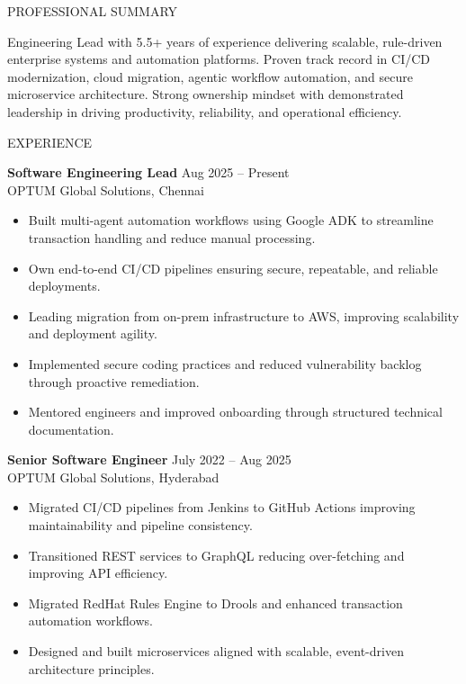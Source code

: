 \documentclass{resume}
\begin{document}
\begin{rSection}{PROFESSIONAL SUMMARY}

Engineering Lead with 5.5+ years of experience delivering scalable, rule-driven enterprise systems and automation platforms. Proven track record in CI/CD modernization, cloud migration, agentic workflow automation, and secure microservice architecture. Strong ownership mindset with demonstrated leadership in driving productivity, reliability, and operational efficiency.

\end{rSection}

\begin{rSection}{EXPERIENCE}

\textbf{Software Engineering Lead} \hfill Aug 2025 – Present \\
OPTUM Global Solutions, Chennai
\begin{itemize}
\itemsep -3pt {}
\item Built multi-agent automation workflows using Google ADK to streamline transaction handling and reduce manual processing.
\item Own end-to-end CI/CD pipelines ensuring secure, repeatable, and reliable deployments.
\item Leading migration from on-prem infrastructure to AWS, improving scalability and deployment agility.
\item Implemented secure coding practices and reduced vulnerability backlog through proactive remediation.
\item Mentored engineers and improved onboarding through structured technical documentation.
\end{itemize}

\textbf{Senior Software Engineer} \hfill July 2022 – Aug 2025 \\
OPTUM Global Solutions, Hyderabad
\begin{itemize}
\itemsep -3pt {}
\item Migrated CI/CD pipelines from Jenkins to GitHub Actions improving maintainability and pipeline consistency.
\item Transitioned REST services to GraphQL reducing over-fetching and improving API efficiency.
\item Migrated RedHat Rules Engine to Drools and enhanced transaction automation workflows.
\item Designed and built microservices aligned with scalable, event-driven architecture principles.
\end{itemize}


\end{rSection}
\end{document}
